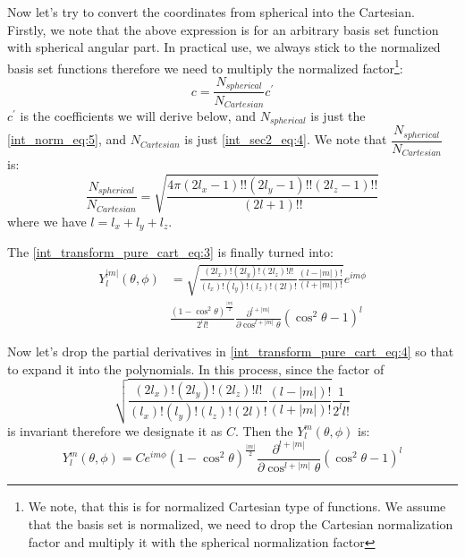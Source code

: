Now let's try to convert the coordinates from spherical into the Cartesian. Firstly, 
we note that the above expression is for an arbitrary basis set function with 
spherical angular part. In practical use, we always stick to the normalized basis set
functions therefore we need to multiply the normalized factor\footnote{We note, that 
this is for normalized Cartesian type of functions. We assume that the basis set is
normalized, we need to drop the Cartesian normalization factor and multiply it with
the spherical normalization factor}:
\begin{equation}
 c = \frac{N_{spherical}}{N_{Cartesian}} c^{'}
\end{equation}
$c^{'}$ is the coefficients we will derive below, and $N_{spherical}$ is just the 
\ref{int_norm_eq:5}, and $N_{Cartesian}$ is just \ref{int_sec2_eq:4}. We note 
that $\dfrac{N_{spherical}}{N_{Cartesian}}$ is:
\begin{equation}
 \frac{N_{spherical}}{N_{Cartesian}} = \sqrt{\frac{4\pi 
 (2l_{x}-1)!!(2l_{y}-1)!!(2l_{z}-1)!!}{(2l+1)!!}}
\end{equation}
where we have $l = l_{x} + l_{y} + l_{z}$.

The \ref{int_transform_pure_cart_eq:3} is finally turned into:
\begin{equation}
\begin{split}
Y^{|m|}_{l}(\theta,\phi) &= 
\sqrt{\frac{(2l_{x})!(2l_{y})!(2l_{z})!l!}{(l_{x})!(l_{y})!(l_{z})!(2l)!}
\frac{(l-|m|)!}{(l+|m|)!}}e^{im\phi} \\
&\frac{(1-\cos^{2}\theta)^{\frac{|m|}{2}}}{2^{l}l!}
\frac{\partial^{l+|m|}}{\partial\cos^{l+|m|}\theta}(\cos^{2}\theta-1)^{l} 
\end{split}
\label{int_transform_pure_cart_eq:4}
\end{equation}

Now let's drop the partial derivatives in \ref{int_transform_pure_cart_eq:4} so that to 
expand it into the polynomials. In this process, since the factor of 
\begin{equation}
\sqrt{\frac{(2l_{x})!(2l_{y})!(2l_{z})!l!}{(l_{x})!(l_{y})!(l_{z})!(2l)!}
\frac{(l-|m|)!}{(l+|m|)!}}\frac{1}{2^{l}l!}
\end{equation}
is invariant therefore we designate it as $C$. Then the $Y^{m}_{l}(\theta,\phi)$ is:
\begin{equation}
 Y^{m}_{l}(\theta,\phi) = C
e^{im\phi}(1-\cos^{2}\theta)^{\frac{|m|}{2}}
\frac{\partial^{l+|m|}}{\partial\cos^{l+|m|}\theta}(\cos^{2}\theta-1)^{l}
\label{int_transform_pure_cart_eq:5}
\end{equation}

